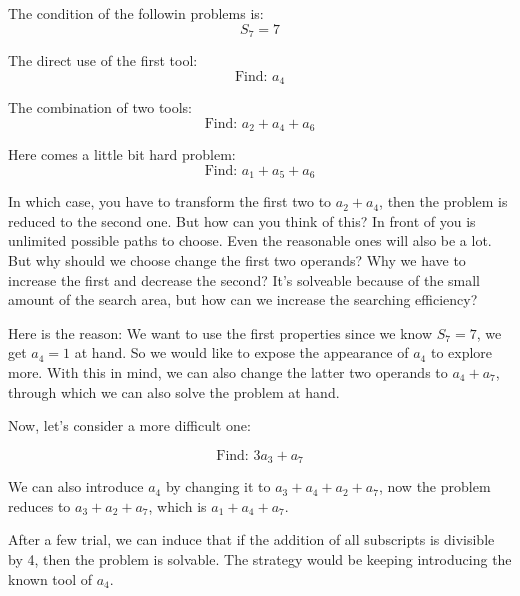 The condition of the followin problems is:
\[ S_7 = 7 \]

The direct use of the first tool:
\[ \text{Find: } a_4 \]

The combination of two tools:
\[ \text{Find: } a_2 + a_4 + a_6 \]

Here comes a little bit hard problem:
\[ \text{Find: } a_1 + a_5 + a_6 \]

In which case, you have to transform the first two to $a_2 + a_4$, then the problem is reduced to the second one. But how can you think of this? In front of you is unlimited possible paths to choose. Even the reasonable ones will also be a lot. But why should we choose change the first two operands? Why we have to increase the first and decrease the second? It's solveable because of the small amount of the search area, but how can we increase the searching efficiency?

Here is the reason: We want to use the first properties since we know $S_7 = 7$, we get $a_4 = 1$ at hand. So we would like to expose the appearance of $a_4$ to explore more. With this in mind, we can also change the latter two operands to $a_4+ a_7$, through which we can also solve the problem at hand.

Now, let's consider a more difficult one:

\[ \text{Find: } 3a_3 +a_7 \]

We can also introduce $a_4$ by changing it to $a_3+ a_4 + a_2 + a_7$, now the problem reduces to $a_3+a_2+a_7$, which is $a_1 + a_4 + a_7$.

After a few trial, we can induce that if the addition of all subscripts is divisible by 4, then the problem is solvable. The strategy would be keeping introducing the known tool of $a_4$.
